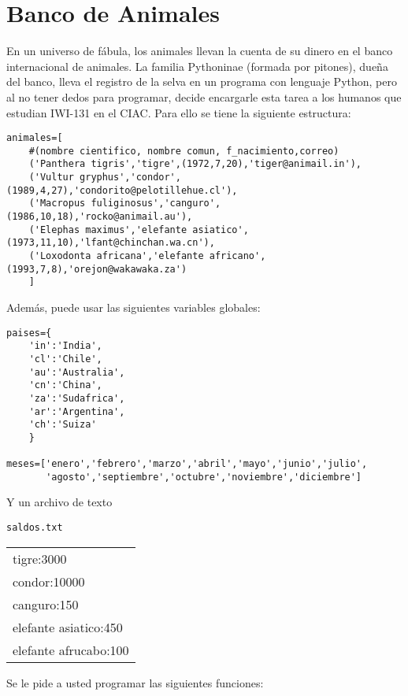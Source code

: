 \section{Banco de Animales}
En un universo de fábula, los animales llevan la cuenta de su dinero en el banco internacional de animales. La familia Pythoninae (formada por pitones), dueña del banco, lleva el registro de la selva en un programa con lenguaje Python, pero al no tener dedos para programar, decide encargarle esta tarea a los humanos que estudian IWI-131 en el CIAC. Para ello se tiene la siguiente estructura:

\begin{lstlisting}[style=consola]
animales=[
    #(nombre cientifico, nombre comun, f_nacimiento,correo)
    ('Panthera tigris','tigre',(1972,7,20),'tiger@animail.in'),
    ('Vultur gryphus','condor',(1989,4,27),'condorito@pelotillehue.cl'),
    ('Macropus fuliginosus','canguro',(1986,10,18),'rocko@animail.au'),
    ('Elephas maximus','elefante asiatico',(1973,11,10),'lfant@chinchan.wa.cn'),
    ('Loxodonta africana','elefante africano',(1993,7,8),'orejon@wakawaka.za')
    ]
\end{lstlisting}

Además, puede usar las siguientes variables globales:
\begin{lstlisting}[style=consola]
paises={
    'in':'India',
    'cl':'Chile',
    'au':'Australia',
    'cn':'China',
    'za':'Sudafrica',
    'ar':'Argentina',
    'ch':'Suiza'
    }
    
meses=['enero','febrero','marzo','abril','mayo','junio','julio',
       'agosto','septiembre','octubre','noviembre','diciembre']
\end{lstlisting}

Y un archivo de texto
\begin{center}
\texttt{saldos.txt}\\
	\begin{tabular}{|l|}
		\hline
tigre:3000\\
condor:10000\\
canguro:150\\
elefante asiatico:450\\
elefante afrucabo:100\\
		\hline
	\end{tabular}
\end{center}

Se le pide a usted programar las siguientes funciones:

